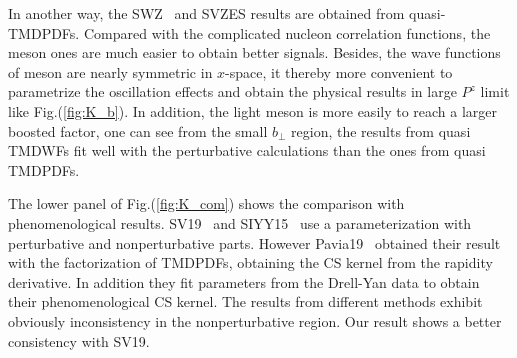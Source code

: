 In another way, the SWZ~\cite{Shanahan:2021tst} and SVZES\cite{Schlemmer:2021aij} results are obtained from quasi-TMDPDFs. Compared with the complicated nucleon correlation functions, the meson ones are much easier to obtain better signals.  Besides, the wave functions of meson are nearly symmetric in $x$-space, it thereby more convenient to parametrize the oscillation effects and obtain the physical results in large $P^z$ limit like Fig.(\ref{fig:K_b}). In addition, the light meson is more easily to reach a larger boosted factor, one can see from the small $b_{\perp}$ region, the results from quasi TMDWFs fit well with the perturbative calculations than the ones from quasi TMDPDFs.

The lower panel of Fig.(\ref{fig:K_com}) shows the comparison with phenomenological results. SV19~\cite{Scimemi:2019cmh} and SIYY15~\cite{Sun:2014dqm} use a parameterization with perturbative and nonperturbative parts. However Pavia19~\cite{Bacchetta:2019sam} obtained their result with the factorization of TMDPDFs, obtaining the CS kernel from the rapidity derivative. In addition they fit parameters from the Drell-Yan data to obtain their phenomenological CS kernel. The results from different methods exhibit obviously inconsistency in the nonperturbative region. Our result shows a better consistency with SV19.
